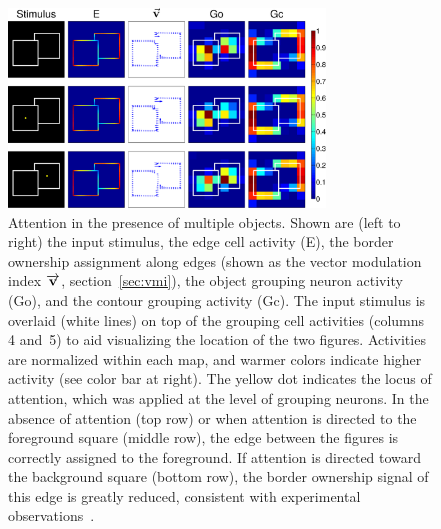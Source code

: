 \begin{figure}[t]
\begin{center}
\includegraphics[width=0.75\textwidth]{Contour/figs/FigS3.eps}
\end{center}
\makeatletter
\let\@currsize\normalsize
\caption[Attention modulates border ownership in the presence of multiple objects]{Attention in the presence of multiple objects. Shown are  (left to right) the input stimulus, the edge cell activity (E), the  border ownership assignment along edges (shown as the vector  modulation index
$\protect\overrightarrow{\protect\mathbf{v}}$,
section~\ref{sec:vmi}), the object grouping neuron activity (Go), and the contour grouping activity (Gc). The input stimulus is overlaid (white lines) on top of the grouping cell activities (columns 4 and~5) to aid visualizing the location of the two figures. Activities are normalized within each map, and warmer colors indicate higher activity (see color bar at right). The yellow dot indicates the locus of attention, which was applied at the level of grouping neurons. In the absence of attention (top row) or when attention is directed to the foreground square (middle row), the edge between the figures is correctly assigned to the foreground. If attention is directed toward the background square (bottom row), the border ownership signal of this edge is greatly reduced, consistent with experimental observations~\citep{Qiu_etal07}.}
\label{Fig:Overlap_Square}
\end{figure}

